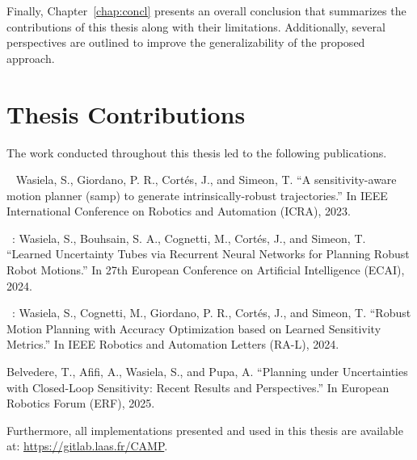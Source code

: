 Finally, Chapter~\ref{chap:concl} presents an overall conclusion that summarizes the contributions of this thesis along with their limitations.
Additionally, several perspectives are outlined to improve the generalizability of the proposed approach.

\section{Thesis Contributions}

The work conducted throughout this thesis led to the following publications. 

~\cite{cSAMP} Wasiela, S., Giordano, P. R., Cortés, J., and Simeon, T. ``A sensitivity-aware motion planner (samp) to generate intrinsically-robust trajectories.'' In IEEE International Conference on Robotics and Automation (ICRA), 2023.

~\cite{cECAI}: Wasiela, S., Bouhsain, S. A., Cognetti, M., Cortés, J., and Simeon, T. ``Learned Uncertainty Tubes via Recurrent Neural Networks for Planning Robust Robot Motions.'' In 27th European Conference on Artificial Intelligence (ECAI), 2024.

~\cite{cRAL}: Wasiela, S., Cognetti, M., Giordano, P. R., Cortés, J., and Simeon, T. ``Robust Motion Planning with Accuracy Optimization based on Learned Sensitivity Metrics.'' In IEEE Robotics and Automation Letters (RA-L), 2024.

Belvedere, T., Afifi, A., Wasiela, S., and Pupa, A. ``Planning under Uncertainties with Closed-Loop Sensitivity: Recent Results and Perspectives.'' In European Robotics Forum (ERF), 2025.

Furthermore, all implementations presented and used in this thesis are available at: \href{https://gitlab.laas.fr/CAMP}{https://gitlab.laas.fr/CAMP}.